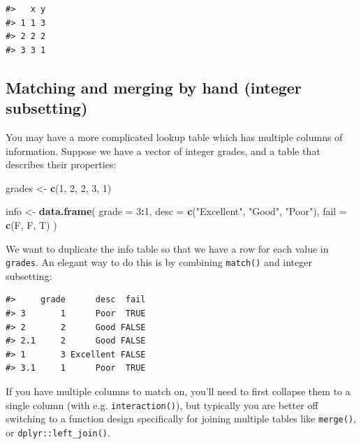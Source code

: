 \documentclass[]{book}
\newenvironment{Shaded}{\begin{snugshade}}{\end{snugshade}}
\newcommand{\KeywordTok}[1]{\textcolor[rgb]{0.13,0.29,0.53}{\textbf{#1}}}
\newcommand{\DataTypeTok}[1]{\textcolor[rgb]{0.13,0.29,0.53}{#1}}
\newcommand{\DecValTok}[1]{\textcolor[rgb]{0.00,0.00,0.81}{#1}}
\newcommand{\StringTok}[1]{\textcolor[rgb]{0.31,0.60,0.02}{#1}}
\newcommand{\OperatorTok}[1]{\textcolor[rgb]{0.81,0.36,0.00}{\textbf{#1}}}
\newcommand{\NormalTok}[1]{#1}
\theoremstyle{definition}
\theoremstyle{definition}
\theoremstyle{definition}
\theoremstyle{remark}
\begin{document}
\begin{verbatim}
#>   x y
#> 1 1 3
#> 2 2 2
#> 3 3 1
\end{verbatim}

\subsection{Matching and merging by hand (integer
subsetting)}\label{matching-and-merging-by-hand-integer-subsetting}

You may have a more complicated lookup table which has multiple columns
of information. Suppose we have a vector of integer grades, and a table
that describes their properties:

\begin{Shaded}
\begin{Highlighting}[]
\NormalTok{grades <-}\StringTok{ }\KeywordTok{c}\NormalTok{(}\DecValTok{1}\NormalTok{, }\DecValTok{2}\NormalTok{, }\DecValTok{2}\NormalTok{, }\DecValTok{3}\NormalTok{, }\DecValTok{1}\NormalTok{)}

\NormalTok{info <-}\StringTok{ }\KeywordTok{data.frame}\NormalTok{(}
  \DataTypeTok{grade =} \DecValTok{3}\OperatorTok{:}\DecValTok{1}\NormalTok{,}
  \DataTypeTok{desc =} \KeywordTok{c}\NormalTok{(}\StringTok{"Excellent"}\NormalTok{, }\StringTok{"Good"}\NormalTok{, }\StringTok{"Poor"}\NormalTok{),}
  \DataTypeTok{fail =} \KeywordTok{c}\NormalTok{(F, F, T)}
\NormalTok{)}
\end{Highlighting}
\end{Shaded}

We want to duplicate the info table so that we have a row for each value
in \texttt{grades}. An elegant way to do this is by combining
\texttt{match()} and integer subsetting:

\begin{Shaded}
\end{Shaded}

\begin{verbatim}
#>     grade      desc  fail
#> 3       1      Poor  TRUE
#> 2       2      Good FALSE
#> 2.1     2      Good FALSE
#> 1       3 Excellent FALSE
#> 3.1     1      Poor  TRUE
\end{verbatim}

If you have multiple columns to match on, you'll need to first collapse
them to a single column (with e.g. \texttt{interaction()}), but
typically you are better off switching to a function design specifically
for joining multiple tables like \texttt{merge()}, or
\texttt{dplyr::left\_join()}.
\end{document}
